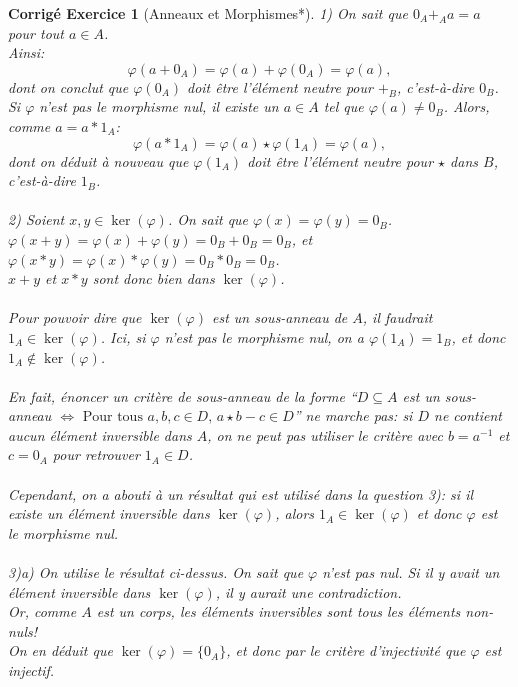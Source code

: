 \documentclass[11pt,french,table]{article}
\theoremstyle{exercice}
\theoremstyle{corrigé}
\newtheorem{corrigé}{Corrigé Exercice}
\begin{document}
\vspace{2em}
\begin{corrigé}[Anneaux et Morphismes*]
1) On sait que $0_A +_A a = a$ pour tout $a \in A$. \\
Ainsi: $$\varphi(a + 0_A) = \varphi(a) + \varphi(0_A) = \varphi(a),$$
dont on conclut que $\varphi(0_A)$ doit être l'élément neutre pour $+_B$, c'est-à-dire $0_B$. \\
Si $\varphi$ n'est pas le morphisme nul, il existe un $a \in A$ tel que $\varphi(a) \neq 0_B$. Alors, comme $a = a * 1_A$:
$$\varphi(a * 1_A) = \varphi(a) \star \varphi(1_A) = \varphi(a),$$
dont on déduit à nouveau que $\varphi(1_A)$ doit être l'élément neutre pour $\star$ dans $B$, c'est-à-dire $1_B$. \\ \\
2) Soient $x, y \in \ker(\varphi)$. On sait que $\varphi(x) = \varphi(y) = 0_B$. \\
$\varphi(x + y) = \varphi(x) + \varphi(y) = 0_B + 0_B=0_B$, et $\varphi(x*y) = \varphi(x) * \varphi(y) = 0_B * 0_B = 0_B$. \\
$x+y$ et $x * y$ sont donc bien dans $\ker(\varphi)$. \\
\\
Pour pouvoir dire que $\ker(\varphi)$ est un sous-anneau de $A$, il faudrait $1_A \in \ker(\varphi)$. Ici, si $\varphi$ n'est pas le morphisme nul, on a $\varphi(1_A) = 1_B$, et donc $1_A \notin \ker(\varphi)$. \\
\\
En fait, énoncer un critère de sous-anneau de la forme ``$D \subseteq A$ est un sous-anneau $\iff \text{ Pour tous } a,b,c \in D, \, a \star b - c \in D$'' ne marche pas: si $D$ ne contient aucun élément inversible dans $A$, on ne peut pas utiliser le critère avec $b=a^{-1}$ et $c=0_A$ pour retrouver $1_A \in D$. \\
\\
Cependant, on a abouti à un résultat qui est utilisé dans la question 3): si il existe un élément inversible dans $\ker(\varphi)$, alors $1_A \in \ker(\varphi)$ et donc $\varphi$ est le morphisme nul. \\ \\
3)a) On utilise le résultat ci-dessus. On sait que $\varphi$ n'est pas nul. Si il y avait un élément inversible dans $\ker(\varphi)$, il y aurait une contradiction. \\
Or, comme $A$ est un corps, les éléments inversibles sont tous les éléments non-nuls! \\
On en déduit que $\ker(\varphi) = \{0_A\}$, et donc par le critère d'injectivité que $\varphi$ est injectif. \\

\end{corrigé}
\end{document}
